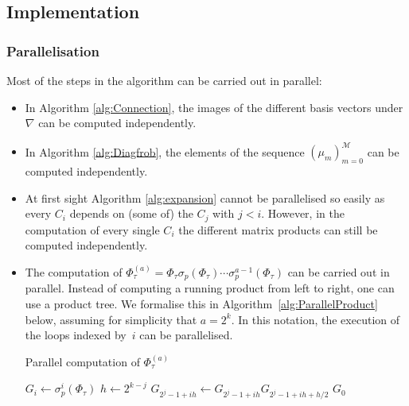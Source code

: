 \documentclass[a4paper,11pt]{article}
\numberwithin{equation}{section}
\theoremstyle{definition}
\begin{document}
\subsection{Implementation}

\subsubsection{Parallelisation}

Most of the steps in the algorithm can be
carried out in parallel:
\begin{itemize}
\item In Algorithm \ref{alg:Connection}, the images of the different 
      basis vectors under $\nabla$ can be computed independently.
\item In Algorithm \ref{alg:Diagfrob}, the elements of the sequence 
      $(\mu_m)_{m=0}^{\mathcal{M}}$ can be computed independently.
\item At first sight Algorithm \ref{alg:expansion} cannot be parallelised so easily 
      as every $C_{i}$ depends on (some of) the $C_{j}$ with $j < i$. However, in
      the computation of every single $C_i$ the different matrix products can
      still be computed independently.
\item The computation of 
      $\Phi_{\tau}^{(a)}=\Phi_{\tau} \sigma_p(\Phi_{\tau}) \dotsm \sigma_p^{a-1}(\Phi_{\tau})$ 
      can be carried out in parallel.  Instead of computing 
      a running product from left to right, one can use a 
      product tree.  We formalise this in Algorithm~\ref{alg:ParallelProduct} below, 
      assuming for simplicity that $a = 2^k$.  In this notation, the execution 
      of the loops indexed by~$i$ can be parallelised.
      \begin{algorithm}
      \caption{Parallel computation of $\Phi_{\tau}^{(a)}$}
      \label{alg:ParallelProduct}
      \begin{algorithmic}
      \vspace{1mm}
          \State $G_i \gets \sigma_p^{i}(\Phi_{\tau})$
      \EndFor
          \State $h \gets 2^{k-j}$
          \State $G_{2^j-1 + ih} \gets G_{2^j-1 + i h} G_{2^j-1 + ih + h/2}$
          \EndFor
      \EndFor
      \Return $G_0$
      \end{algorithmic}
      \end{algorithm}
\end{itemize}
\end{document}
